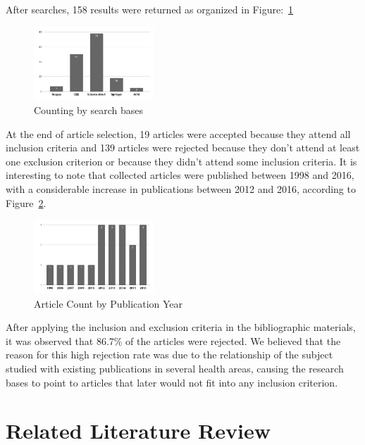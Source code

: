 After searches, 158 results were returned as organized in Figure:~\ref{bases}

\begin{figure}[H]
\begin{center}
\includegraphics[width=0.4\textwidth]{base_de_dados_de_origem.png}
\caption{Counting by search bases \label{bases}}
\end{center}
\end{figure}

At the end of article selection, 19 articles were accepted because they attend all inclusion criteria and 139 articles were rejected because they don't attend at least one exclusion criterion or because they didn't attend some inclusion criteria. It is interesting to note that collected articles were published between 1998 and 2016, with a considerable increase in publications between 2012 and 2016, according to Figure~\ref{ano}.

\begin{figure}[H]
\begin{center}
\includegraphics[width=0.4\textwidth]{contagem_por_ano.png}
\caption{Article Count by Publication Year \label{ano}}
\end{center}
\end{figure}

After applying the inclusion and exclusion criteria in the bibliographic materials, it was observed that 86.7\% of the articles were rejected. We believed that the reason for this high rejection rate was due to the relationship of the subject studied with existing publications in several health areas, causing the research bases to point to articles that later would not fit into any inclusion criterion.

\section{Related Literature Review}

